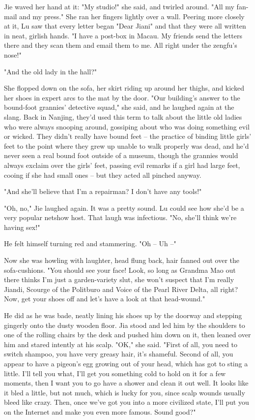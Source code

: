 Jie waved her hand at it: "My studio!" she said, and twirled
around. "All my fan-mail and my press." She ran her fingers lightly
over a wall. Peering more closely at it, Lu saw that every letter
began "Dear Jiani" and that they were all written in neat, girlish
hands. "I have a post-box in Macau. My friends send the letters
there and they scan them and email them to me. All right under the
zengfu's nose!"

"And the old lady in the hall?"

She flopped down on the sofa, her skirt riding up around her
thighs, and kicked her shoes in expert arcs to the mat by the door.
"Our building's answer to the bound-foot grannies' detective
squad," she said, and he laughed again at the slang. Back in
Nanjing, they'd used this term to talk about the little old ladies
who were always snooping around, gossiping about who was doing
something evil or wicked. They didn't really have bound feet -- the
practice of binding little girls' feet to the point where they grew
up unable to walk properly was dead, and he'd never seen a real
bound foot outside of a museum, though the grannies would always
exclaim over the girls' feet, passing evil remarks if a girl had
large feet, cooing if she had small ones -- but they acted all
pinched anyway.

"And she'll believe that I'm a repairman? I don't have any tools!"

"Oh, no," Jie laughed again. It was a pretty sound. Lu could see
how she'd be a very popular netshow host. That laugh was
infectious. "No, she'll think we're having sex!"

He felt himself turning red and stammering. "Oh -- Uh --"

Now she was howling with laughter, head flung back, hair fanned out
over the sofa-cushions. "You should see your face! Look, so long as
Grandma Mao out there thinks I'm just a garden-variety slut, she
won't suspect that I'm really Jiandi, Scourge of the Politburo and
Voice of the Pearl River Delta, all right? Now, get your shoes off
and let's have a look at that head-wound."

He did as he was bade, neatly lining his shoes up by the doorway
and stepping gingerly onto the dusty wooden floor. Jia stood and
led him by the shoulders to one of the rolling chairs by the desk
and pushed him down on it, then leaned over him and stared intently
at his scalp. "OK," she said. "First of all, you need to switch
shampoo, you have very greasy hair, it's shameful. Second of all,
you appear to have a pigeon's egg growing out of your head, which
has got to sting a little. I'll tell you what, I'll get you
something cold to hold on it for a few moments, then I want you to
go have a shower and clean it out well. It looks like it bled a
little, but not much, which is lucky for you, since scalp wounds
usually bleed like crazy. Then, once we've got you into a more
civilized state, I'll put you on the Internet and make you even
more famous. Sound good?"

